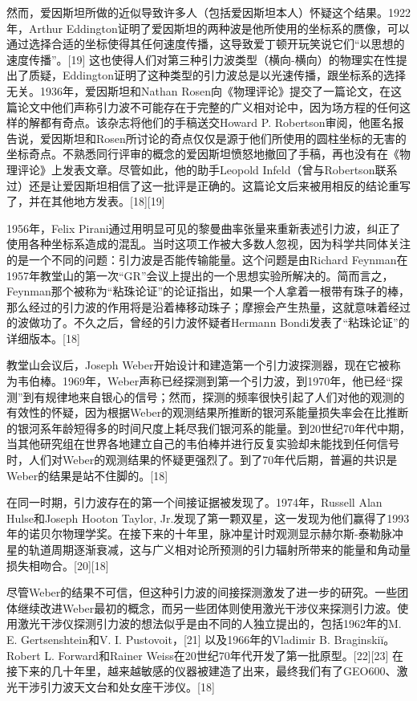 然而，爱因斯坦所做的近似导致许多人（包括爱因斯坦本人）怀疑这个结果。1922年，Arthur Eddington证明了爱因斯坦的两种波是他所使用的坐标系的赝像，可以通过选择合适的坐标使得其任何速度传播，这导致爱丁顿开玩笑说它们“以思想的速度传播”。[19] 这也使得人们对第三种引力波类型（横向-横向）的物理实在性提出了质疑，Eddington证明了这种类型的引力波总是以光速传播，跟坐标系的选择无关。1936年，爱因斯坦和Nathan Rosen向《物理评论》提交了一篇论文，在这篇论文中他们声称引力波不可能存在于完整的广义相对论中，因为场方程的任何这样的解都有奇点。该杂志将他们的手稿送交Howard P. Robertson审阅，他匿名报告说，爱因斯坦和Rosen所讨论的奇点仅仅是源于他们所使用的圆柱坐标的无害的坐标奇点。不熟悉同行评审的概念的爱因斯坦愤怒地撤回了手稿，再也没有在《物理评论》上发表文章。尽管如此，他的助手Leopold Infeld（曾与Robertson联系过）还是让爱因斯坦相信了这一批评是正确的。这篇论文后来被用相反的结论重写了，并在其他地方发表。[18][19]

1956年，Felix Pirani通过用明显可见的黎曼曲率张量来重新表述引力波，纠正了使用各种坐标系造成的混乱。当时这项工作被大多数人忽视，因为科学共同体关注的是一个不同的问题：引力波是否能传输能量。这个问题是由Richard Feynman在1957年教堂山的第一次“GR”会议上提出的一个思想实验所解决的。简而言之，Feynman那个被称为“粘珠论证”的论证指出，如果一个人拿着一根带有珠子的棒，那么经过的引力波的作用将是沿着棒移动珠子；摩擦会产生热量，这就意味着经过的波做功了。不久之后，曾经的引力波怀疑者Hermann Bondi发表了“粘珠论证”的详细版本。[18]

教堂山会议后，Joseph Weber开始设计和建造第一个引力波探测器，现在它被称为韦伯棒。1969年，Weber声称已经探测到第一个引力波，到1970年，他已经“探测”到有规律地来自银心的信号；然而，探测的频率很快引起了人们对他的观测的有效性的怀疑，因为根据Weber的观测结果所推断的银河系能量损失率会在比推断的银河系年龄短得多的时间尺度上耗尽我们银河系的能量。到20世纪70年代中期，当其他研究组在世界各地建立自己的韦伯棒并进行反复实验却未能找到任何信号时，人们对Weber的观测结果的怀疑更强烈了。到了70年代后期，普遍的共识是Weber的结果是站不住脚的。[18]

在同一时期，引力波存在的第一个间接证据被发现了。1974年，Russell Alan Hulse和Joseph Hooton Taylor, Jr.发现了第一颗双星，这一发现为他们赢得了1993年的诺贝尔物理学奖。在接下来的十年里，脉冲星计时观测显示赫尔斯-泰勒脉冲星的轨道周期逐渐衰减，这与广义相对论所预测的引力辐射所带来的能量和角动量损失相吻合。[20][18]

尽管Weber的结果不可信，但这种引力波的间接探测激发了进一步的研究。一些团体继续改进Weber最初的概念，而另一些团体则使用激光干涉仪来探测引力波。使用激光干涉仪探测引力波的想法似乎是由不同的人独立提出的，包括1962年的M. E. Gertsenshtein和V. I. Pustovoit，[21] 以及1966年的Vladimir B. Braginskiĭ。Robert L. Forward和Rainer Weiss在20世纪70年代开发了第一批原型。[22][23] 在接下来的几十年里，越来越敏感的仪器被建造了出来，最终我们有了GEO600、激光干涉引力波天文台和处女座干涉仪。[18]


